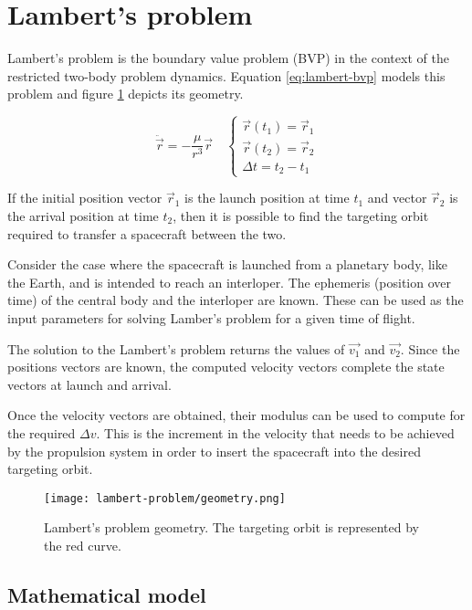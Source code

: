 \section{Lambert's problem}

Lambert's problem is the boundary value problem (BVP) in the context of the
restricted two-body problem dynamics. Equation \ref{eq:lambert-bvp} models this
problem and figure \ref{fig:lambert-geometry} depicts its geometry.

\begin{equation}
    \ddot{\vec{r}} = -\frac{\mu}{r^3}\vec{r} \quad \begin{cases}
        \vec{r}(t_1) = \vec{r}_1 \\ 
        \vec{r}(t_2) = \vec{r}_2 \\ 
        \Delta t = t_2 - t_1
    \end{cases}
    \label{eq:lambert-bvp}
\end{equation}

If the initial position vector $\vec{r}_1$ is the launch position at time
$t_1$ and vector $\vec{r}_2$ is the arrival position at time $t_2$,
then it is possible to find the targeting orbit required to transfer a
spacecraft between the two.

Consider the case where the spacecraft is launched from a planetary body, like
the Earth, and is intended to reach an interloper. The ephemeris (position over
time) of the central body and the interloper are known. These can be used as the
input parameters for solving Lamber's problem for a given time of flight.

The solution to the Lambert's problem returns the values of $\vec{v_1}$ and
$\vec{v_2}$. Since the positions vectors are known, the computed velocity
vectors complete the state vectors at launch and arrival.

Once the velocity vectors are obtained, their modulus can be used to compute for
the required $\Delta v$. This is the increment in the velocity that needs to be
achieved by the propulsion system in order to insert the spacecraft into the
desired targeting orbit.

\begin{figure}[H]
    \centering
    \texttt{[image: lambert-problem/geometry.png]}
    \caption{Lambert's problem geometry. The targeting orbit is represented by the red curve.}
    \label{fig:lambert-geometry}
\end{figure}

\subsection{Mathematical model}

